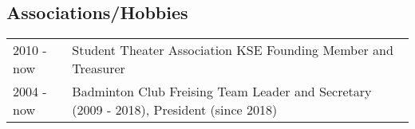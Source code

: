 \documentclass[a4paper,10pt]{memoir}
\begin{document}
\subsection*{Associations/Hobbies}
\vspace*{-\baselineskip}
\begin{longtable}{@{}p{} p{}}
  2010 - now &
  Student Theater Association KSE \newline
  Founding Member and Treasurer
  \\
  2004 - now &
  Badminton Club Freising \newline
  Team Leader and Secretary (2009 - 2018), President (since 2018)
\end{longtable}
\end{document}
